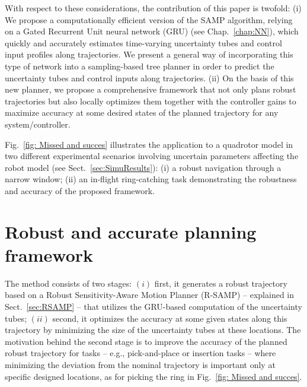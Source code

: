 With respect to these considerations, the contribution of this paper is twofold:
(i) We propose a computationally efficient version of the SAMP algorithm,
relying on a Gated Recurrent Unit neural network (GRU)\cite{cGRU} (see Chap.~\ref{chap:NN}), which quickly and accurately estimates time-varying uncertainty tubes and control input profiles along trajectories.
We present a general way of incorporating this type of network into a sampling-based tree planner in order to predict the uncertainty tubes and control inputs along trajectories. 
(ii) On the basis of this new planner, 
we propose a comprehensive framework that not only plans robust trajectories but also locally optimizes them together with the controller gains to maximize accuracy at some desired states of the planned trajectory for any system/controller.

Fig.~\ref{fig: Missed and succes} illustrates the application to a quadrotor model in two different experimental scenarios involving uncertain parameters affecting the robot model (see Sect.~\ref{sec:SimuResults}): (i) a robust navigation through a narrow window;
(ii) an in-flight ring-catching task demonstrating the robustness and accuracy of the proposed framework. 


\section{Robust and accurate planning framework}\label{sec:RASAMP}

The method consists of two stages: $(i)$ first, it generates a robust trajectory based on a Robust Sensitivity-Aware Motion Planner (R-SAMP) -- explained in Sect.~\ref{sec:RSAMP} -- that utilizes the GRU-based computation of the uncertainty tubes; $(ii)$ second, it optimizes the accuracy at some given states along this trajectory by minimizing the size of the uncertainty tubes at these locations.
The motivation behind the second stage is to improve the accuracy of the planned robust trajectory for tasks -- e.g., pick-and-place or insertion tasks -- where minimizing the deviation from the nominal trajectory is important only at specific designed locations, as for picking the ring in Fig.~\ref{fig: Missed and succes}.

